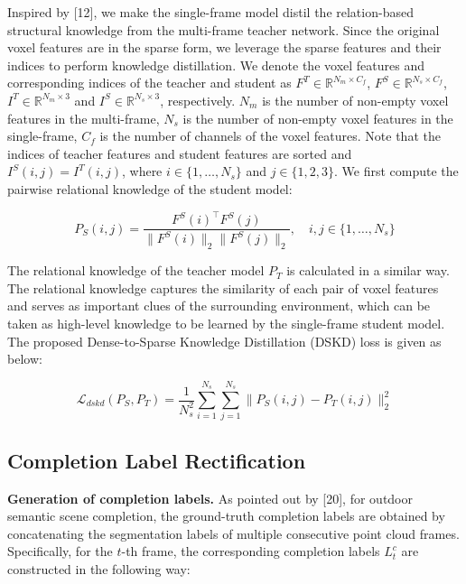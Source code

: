 \documentclass[10pt,twocolumn,letterpaper]{article}
\begin{document}
Inspired by [12], we make the single-frame model distil the relation-based structural knowledge from the multi-frame teacher network. Since the original voxel features are in the sparse form, we leverage the sparse features and their indices to perform knowledge distillation. We denote the voxel features and corresponding indices of the teacher and student as $F^T \in \mathbb{R}^{N_m \times C_f}$, $F^S \in \mathbb{R}^{N_s \times C_f}$, $I^T \in \mathbb{R}^{N_m \times 3}$ and $I^S \in \mathbb{R}^{N_s \times 3}$, respectively. $N_m$ is the number of non-empty voxel features in the multi-frame, $N_s$ is the number of non-empty voxel features in the single-frame, $C_f$ is the number of channels of the voxel features. Note that the indices of teacher features and student features are sorted and $I^S(i,j) = I^T(i,j)$, where $i \in \{1,\ldots,N_s\}$ and $j \in \{1,2,3\}$. We first compute the pairwise relational knowledge of the student model:

\begin{equation}
  P_S(i,j) = \frac{F^S(i)^\top F^S(j)}{\|F^S(i)\|_2 \|F^S(j)\|_2}, \quad i,j \in \{1,\ldots,N_s\}
  \label{eq:pairwise}
\end{equation}

The relational knowledge of the teacher model $P_T$ is calculated in a similar way. The relational knowledge captures the similarity of each pair of voxel features and serves as important clues of the surrounding environment, which can be taken as high-level knowledge to be learned by the single-frame student model. The proposed Dense-to-Sparse Knowledge Distillation (DSKD) loss is given as below:

\begin{equation}
  \mathcal{L}_{dskd}(P_S, P_T) = \frac{1}{N_s^2} \sum_{i=1}^{N_s} \sum_{j=1}^{N_s} \|P_S(i,j) - P_T(i,j)\|_2^2
  \label{eq:dskd}
\end{equation}

\subsection{Completion Label Rectification}

\textbf{Generation of completion labels.}
As pointed out by [20], for outdoor semantic scene completion, the ground-truth completion labels are obtained by concatenating the segmentation labels of multiple consecutive point cloud frames. Specifically, for the $t$-th frame, the corresponding completion labels $L^c_t$ are constructed in the following way:
\end{document}
